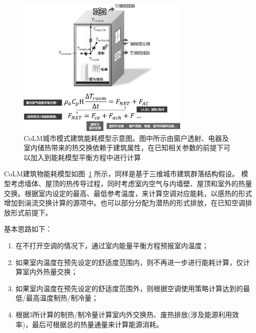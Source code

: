{
  \begin{figure}[htbp]
    \centering
    \includegraphics[width=0.75\textwidth]{Figures/城市模式/CoLM城市模式建筑能耗示意图.png}
    \caption[CoLM城市模式建筑能耗模型示意图]{CoLM城市模式建筑能耗模型示意图。图中所示由窗户透射、电器及室内储热带来的热交换依赖于建筑属性，在已知相关参数的前提下可以加入到能耗模型平衡方程中进行计算}
    \label{fig:建筑能耗模型示意图}
  \end{figure}
}

CoLM建筑物能耗模型如图~\ref{fig:建筑能耗模型示意图} 所示，同样是基于三维城市建筑群落结构假设。
模型考虑墙体、屋顶的热传导过程，同时考虑室内空气与内墙壁、屋顶和室外的热量交换。根据室内设定的最高、最低参考温度，来计算空调对应能耗，以感热的形式增加到湍流交换计算的源项中。也可以部分分配为潜热的形式排放，在已知空调排放形式前提下。

基本思路如下：

\begin{enumerate}
  \item 在不打开空调的情况下，通过室内能量平衡方程预报室内温度；
  \item 如果室内温度在预先设定的舒适度范围内，则不再进一步进行能耗计算，仅计算室内外热量交换；
  \item 如果室内温度在预先设定的舒适度范围外，则根据空调使用策略计算达到的最低/最高温度制热/制冷量；
  \item 根据3所计算的制热/制冷量计算室内外交换热、废热排放(涉及能源利用效率)，最后可根据总的热量通量来计算能源消耗。
\end{enumerate}

